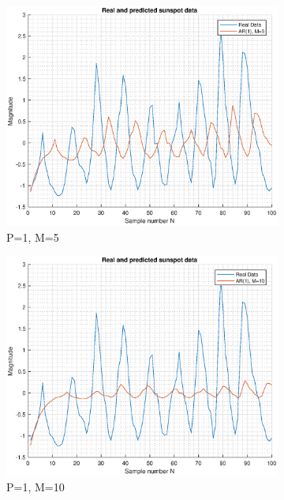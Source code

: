 \documentclass{article}
\begin{document}
\begin{figure}[h!]
\begin{subfigure}{0.24\textwidth}
\centering
\includegraphics[width = \textwidth]{ar_mod1_hor5}
\caption{P=1, M=5}
\label{fig:ar_mod1_hor5}
\end{subfigure}
\begin{subfigure}{0.24\textwidth}
\centering
\includegraphics[width = \textwidth]{ar_mod1_hor10}
\caption{P=1, M=10}
\label{fig:ar_mod1_hor10}
\end{subfigure}
\begin{subfigure}{0.24\textwidth}
\centering

\end{subfigure}
\end{figure}
\end{document}
